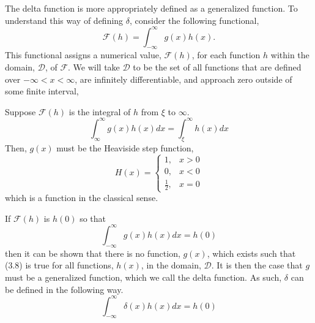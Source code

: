 The delta function is more appropriately defined as a generalized function. To understand this way of defining \(\delta\), consider the following functional,
\begin{equation}
    \mathcal{F}(h) = \int_{-\infty}^{\infty} g(x)h(x).
\end{equation}
This functional assigns a numerical value, \(\mathcal{F}(h)\), for each function \(h\) within the domain, \(\mathcal{D}\), of \(\mathcal{F}\). We will take \(\mathcal{D}\) to be the set of all functions that are defined over \(-\infty <x<\infty\), are infinitely differentiable, and approach zero outside of some finite interval,

Suppose \(\mathcal{F}(h)\) is the integral of \(h\) from \(\xi\) to \(\infty\).
\begin{equation}
    \int_{\infty}^{\infty} g(x)h(x)dx = \int_{\xi}^{\infty} h(x) dx
\end{equation}
Then, \(g(x)\) must be the Heaviside step function,
\begin{equation}
    H(x) = \begin{cases}
        1, & x>0\\
        0, & x<0\\
        \frac{1}{2}, & x=0
    \end{cases}
\end{equation}
which is a function in the classical sense.

If \(\mathcal{F}(h)\) is \(h(0)\) so that
\begin{equation}
    \int_{-\infty}^{\infty}g(x)h(x) dx=h(0)
\end{equation}
then it can be shown that there is no function, \(g(x)\), which exists such that (3.8) is true for all functions, \(h(x)\), in the domain, \(\mathcal{D}\). It is then the case that \(g\) must be a generalized function, which we call the delta function. As such, \(\delta\) can be defined in the following way.
\begin{equation}
    \int_{-\infty}^{\infty} \delta(x)h(x) dx = h(0)
\end{equation}

